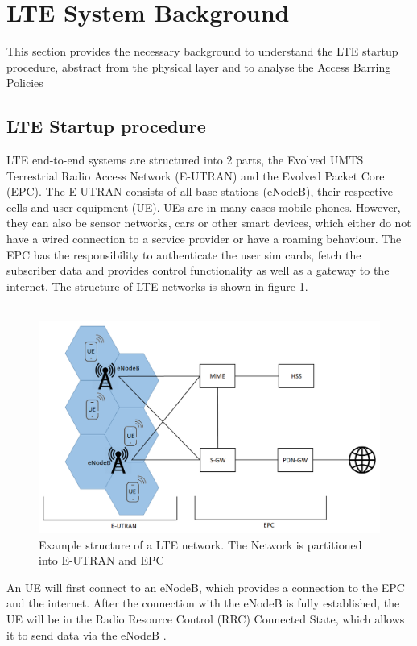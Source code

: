 \documentclass[conference]{IEEEtran}
\begin{document}
\section{LTE System Background}
This section provides the necessary background to understand the LTE startup procedure, abstract from the physical layer and to analyse the Access Barring Policies
\subsection{LTE Startup procedure}
LTE end-to-end systems are structured into 2 parts, the Evolved UMTS Terrestrial Radio Access Network (E-UTRAN) and the Evolved Packet Core (EPC).
The E-UTRAN consists of all base stations (eNodeB), their respective cells and user equipment (UE).
UEs are in many cases mobile phones.
However, they can also be sensor networks, cars or other smart devices, which either do not have a wired connection to a service provider or have a roaming behaviour.
The EPC has the responsibility to authenticate the user sim cards, fetch the subscriber data and provides control functionality as well as a gateway to the internet.
The structure of LTE networks is shown in figure \ref{fig:LTE_Network}.\\\\
\begin{figure}
    \centering
    \includegraphics[width= \columnwidth]{../Figures/LTE_Netzwerk.png}
    \caption{Example structure of a LTE network. The Network is partitioned into E-UTRAN and EPC}
    \label{fig:LTE_Network}
\end{figure}
An UE will first connect to an eNodeB, which provides a connection to the EPC and the internet.
After the connection with the eNodeB is fully established, the UE will be in the Radio Resource Control (RRC) Connected State, which allows it to send data via the eNodeB .
\end{document}
